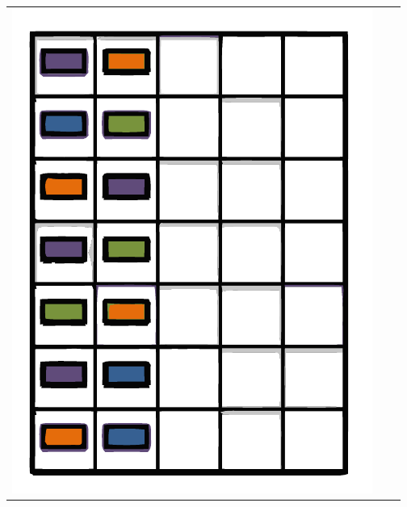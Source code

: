 \documentclass{beamer}
\begin{document}
\begin{frame}
\begin{center}
\begin{tabular}{ccc}
	     		\includegraphics*[scale=0.23]{figures/FD1.pdf} \\
	     		
	     	\end{tabular} 
	     \end{center}
\end{frame}
\end{document}
